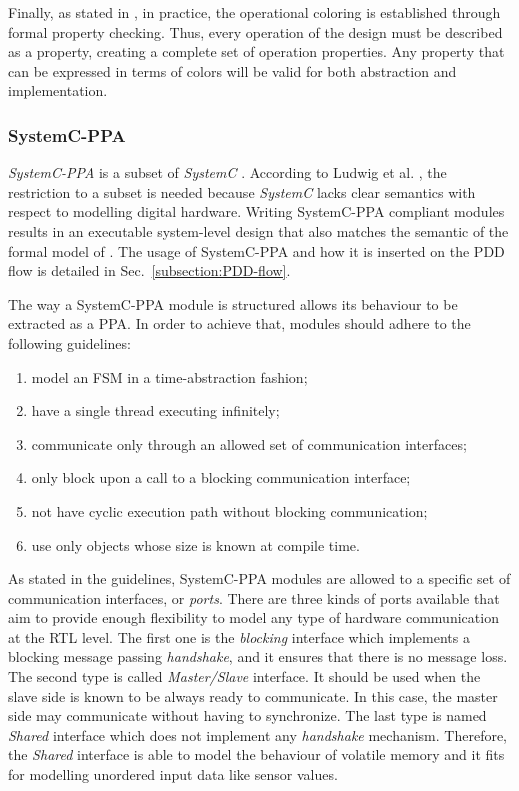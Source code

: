Finally, as stated in \cite{paper-pdd}, in practice, the operational coloring is established through formal property checking. Thus, every operation of the design must be described as a property, creating a complete set of operation properties. Any property that can be expressed in terms of colors will be valid for both abstraction and implementation.

\subsubsection*{SystemC-PPA}

\textit{SystemC-PPA} is a subset of \textit{SystemC} \cite{lib-systemc}. According to Ludwig et al. \cite{paper-pdd}, the restriction to a subset is needed because \textit{SystemC} lacks clear semantics with respect to modelling digital hardware. Writing SystemC-PPA compliant modules results in an executable system-level design that also matches the semantic of the formal model of \cite{paper-pdd}. The usage of SystemC-PPA and how it is inserted on the PDD flow is detailed in Sec.~\ref{subsection:PDD-flow}.

The way a SystemC-PPA module is structured allows its behaviour to be extracted as a PPA. In order to achieve that, modules should adhere to the following guidelines:

\begin{enumerate}
    \item model an FSM in a time-abstraction fashion;
    \item have a single thread executing infinitely;
    \item communicate only through an allowed set of communication interfaces;
    \item only block upon a call to a blocking communication interface;
    \item not have cyclic execution path without blocking communication;
    \item use only objects whose size is known at compile time.
\end{enumerate}

As stated in the guidelines, SystemC-PPA modules are allowed to a specific set of communication interfaces, or \textit{ports}. There are three kinds of ports available that aim to provide enough flexibility to model any type of hardware communication at the RTL level. The first one is the \textit{blocking} interface which implements a blocking message passing \textit{handshake}, and it ensures that there is no message loss. The second type is called \textit{Master/Slave} interface. It should be used when the slave side is known to be always ready to communicate. In this case, the master side may communicate without having to synchronize. The last type is named \textit{Shared} interface which does not implement any \textit{handshake} mechanism. Therefore, the \textit{Shared} interface is able to model the behaviour of volatile memory and it fits for modelling unordered input data like sensor values. 

